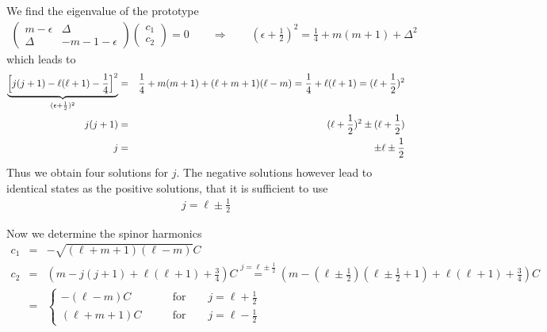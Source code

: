 \documentclass[11pt,a4paper]{report}
\begin{document}
We find the eigenvalue of the prototype
\begin{eqnarray*}
\left(\begin{array}{cc}m-\epsilon &\Delta\\
\Delta & -m-1-\epsilon\end{array}\right)
\left(\begin{array}{c}c_1\\c_2\end{array}\right)
=0\qquad
\Rightarrow\qquad (\epsilon+\frac{1}{2})^2=\frac{1}{4}+m(m+1)+\Delta^2
\end{eqnarray*}
which leads to
\begin{eqnarray*}
\underbrace{\Bigl[j(j+1)-\ell(\ell+1)-\frac{1}{4}\Bigr]^2}_{(\epsilon+\frac{1}{2})^2}
&=&\frac{1}{4}+m(m+1)+(\ell+m+1)(\ell-m)
=\frac{1}{4}+\ell(\ell+1)=(\ell+\frac{1}{2})^2
\\
j(j+1)&=&(\ell+\frac{1}{2})^2\pm(\ell+\frac{1}{2})
\\
j&=&\pm\ell\pm\frac{1}{2}
\end{eqnarray*}
Thus we obtain four solutions for $j$. The negative solutions however lead to identical states as the positive solutions, that it is sufficient to use 
\begin{eqnarray*}
j=\ell\pm\frac{1}{2}
\end{eqnarray*}

Now we determine the spinor harmonics
\begin{eqnarray*}
c_1&=&-\sqrt{(\ell+m+1)(\ell-m)}C
\\
c_2&=&\left(m-j(j+1)+\ell(\ell+1)+\frac{3}{4}\right)C
\stackrel{j=\ell\pm\frac{1}{2}}{=}
\left(m-(\ell\pm\frac{1}{2})(\ell\pm\frac{1}{2}+1)+\ell(\ell+1)+\frac{3}{4}\right)C
\\
&=&\left\lbrace\begin{array}{cc}
-(\ell-m)C\qquad&\text{for}\qquad j=\ell+\frac{1}{2}\\
(\ell+m+1)C\qquad&\text{for}\qquad j=\ell-\frac{1}{2}
\end{array}\right.
\end{eqnarray*}
\end{document}
